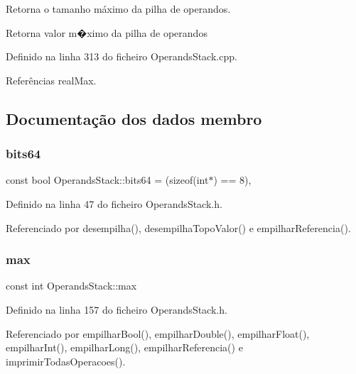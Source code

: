 Retorna o tamanho máximo da pilha de operandos. 

Retorna valor m�ximo da pilha de operandos 

Definido na linha 313 do ficheiro Operands\+Stack.\+cpp.



Referências real\+Max.



\subsection{Documentação dos dados membro}
\mbox{\label{classOperandsStack_a52dbb05109d9b5c88bae178c6fdf00b3}} 
\subsubsection{\texorpdfstring{bits64}{bits64}}
{\footnotesize\ttfamily const bool Operands\+Stack\+::bits64 = (sizeof(int$\ast$) == 8)\hspace{0.3cm}{\ttfamily [static]}, {\ttfamily [private]}}



Definido na linha 47 do ficheiro Operands\+Stack.\+h.



Referenciado por desempilha(), desempilha\+Topo\+Valor() e empilhar\+Referencia().

\mbox{\label{classOperandsStack_ac17a81af6a26d029042e6c7ad598a538}} 
\subsubsection{\texorpdfstring{max}{max}}
{\footnotesize\ttfamily const int Operands\+Stack\+::max}



Definido na linha 157 do ficheiro Operands\+Stack.\+h.



Referenciado por empilhar\+Bool(), empilhar\+Double(), empilhar\+Float(), empilhar\+Int(), empilhar\+Long(), empilhar\+Referencia() e imprimir\+Todas\+Operacoes().

\mbox{\label{classOperandsStack_aac5d565f6032231c195411ba4d75d571}} 
